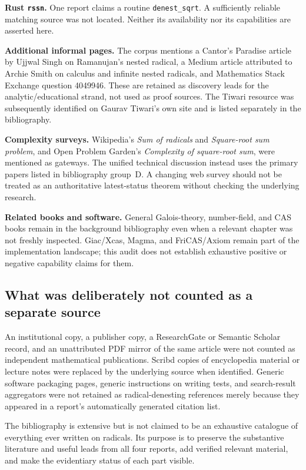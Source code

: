 \documentclass[11pt,a4paper]{article}
\theoremstyle{definition}
\theoremstyle{remark}
\numberwithin{equation}{section}
\begin{document}
\textbf{Rust \texttt{rssn}.} One report claims a routine \texttt{denest\_sqrt}. A sufficiently reliable matching source was not located. Neither its availability nor its capabilities are asserted here.

\textbf{Additional informal pages.} The corpus mentions a Cantor's Paradise article by Ujjwal Singh on Ramanujan's nested radical, a Medium article attributed to Archie Smith on calculus and infinite nested radicals, and Mathematics Stack Exchange question 4049946. These are retained as discovery leads for the analytic/educational strand, not used as proof sources. The Tiwari resource was subsequently identified on Gaurav Tiwari's own site and is listed separately in the bibliography.

\textbf{Complexity surveys.} Wikipedia's \emph{Sum of radicals} and \emph{Square-root sum problem}, and Open Problem Garden's \emph{Complexity of square-root sum}, were mentioned as gateways. The unified technical discussion instead uses the primary papers listed in bibliography group~D. A changing web survey should not be treated as an authoritative latest-status theorem without checking the underlying research.

\textbf{Related books and software.} General Galois-theory, number-field, and CAS books remain in the background bibliography even when a relevant chapter was not freshly inspected. Giac/Xcas, Magma, and FriCAS/Axiom remain part of the implementation landscape; this audit does not establish exhaustive positive or negative capability claims for them.

\subsection{What was deliberately not counted as a separate source}

An institutional copy, a publisher copy, a ResearchGate or Semantic Scholar record, and an unattributed PDF mirror of the same article were not counted as independent mathematical publications. Scribd copies of encyclopedia material or lecture notes were replaced by the underlying source when identified. Generic software packaging pages, generic instructions on writing tests, and search-result aggregators were not retained as radical-denesting references merely because they appeared in a report's automatically generated citation list.

The bibliography is extensive but is not claimed to be an exhaustive catalogue of everything ever written on radicals. Its purpose is to preserve the substantive literature and useful leads from all four reports, add verified relevant material, and make the evidentiary status of each part visible.
\end{document}
